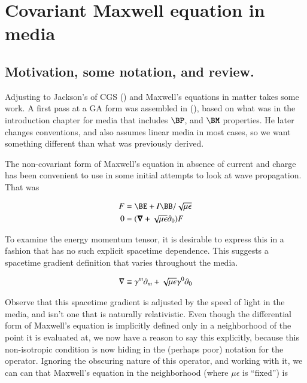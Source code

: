%

\chapter{Covariant Maxwell equation in media}
\label{chap:covariantMedia}
{}
\date{Aug 10, 2009}

\beginArtWithToc

\section{Motivation, some notation, and review.}

Adjusting to Jackson's of CGS (\cite{jackson1975cew}) and Maxwell's equations in matter takes some work.  A first pass at a GA form was assembled in (), based on what was in the introduction chapter for media that includes $\BP$, and $\BM$ properties.  He later changes conventions, and also assumes linear media in most cases, so we want something different than what was previously derived.

The non-covariant form of Maxwell's equation in absence of current and charge has been convenient to use in some initial attempts to look at wave propagation.  That was

\begin{align}\label{eqn:covariantMedia:foo1}
F &= \BE + I\BB/\sqrt{\mu\epsilon} \\
0 &= (\spacegrad + \sqrt{\mu\epsilon} \partial_0) F
\end{align}

To examine the energy momentum tensor, it is desirable to express this in a fashion that has no such explicit spacetime dependence.  This suggests a spacetime gradient definition that varies throughout the media.

\begin{align}\label{eqn:covariantMedia:foo2}
\nabla \equiv \gamma^m \partial_m + \sqrt{\mu\epsilon} \gamma^0 \partial_0
\end{align}

Observe that this spacetime gradient is adjusted by the speed of light in the media, and isn't one that is naturally relativistic.  Even though the differential form of Maxwell's equation is implicitly defined only in a neighborhood of the point it is evaluated at, we now have a reason to say this explicitly, because this non-isotropic condition is now hiding in the (perhaps poor) notation for the operator.  Ignoring the obscuring nature of this operator, and working with it, we can can that Maxwell's equation in the neighborhood (where $\mu\epsilon$ is ``fixed'') is

